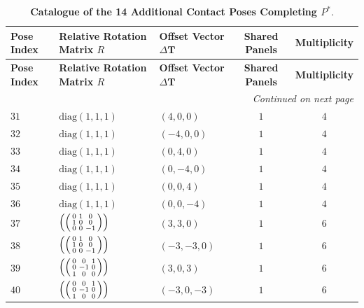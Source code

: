 \documentclass[11pt,a4paper]{article}
\theoremstyle{definition}
\newcommand{\diag}{\mathrm{diag}}
\begin{document}
\begin{longtable}{p{1.2cm}p{3.0cm}p{2.6cm}cc}
\caption{\textbf{Catalogue of the 14 Additional Contact Poses Completing $P^*$}.} \label{tab:app_p_star} \\
\toprule
\textbf{Pose Index} & \textbf{Relative Rotation Matrix $R$} & \textbf{Offset Vector $\Delta\mathbf{T}$} & \textbf{Shared Panels} & \textbf{Multiplicity} \\
\midrule
\endfirsthead
\toprule
\textbf{Pose Index} & \textbf{Relative Rotation Matrix $R$} & \textbf{Offset Vector $\Delta\mathbf{T}$} & \textbf{Shared Panels} & \textbf{Multiplicity} \\
\midrule
\endhead
\midrule
\multicolumn{5}{r}{\small\textit{Continued on next page}} \\
\bottomrule
\endfoot
\bottomrule
\endlastfoot
$31$ & $\diag(1, 1, 1)$ & $(4, 0, 0)$ & $1$ & $4$ \\
$32$ & $\diag(1, 1, 1)$ & $(-4, 0, 0)$ & $1$ & $4$ \\
$33$ & $\diag(1, 1, 1)$ & $(0, 4, 0)$ & $1$ & $4$ \\
$34$ & $\diag(1, 1, 1)$ & $(0, -4, 0)$ & $1$ & $4$ \\
$35$ & $\diag(1, 1, 1)$ & $(0, 0, 4)$ & $1$ & $4$ \\
$36$ & $\diag(1, 1, 1)$ & $(0, 0, -4)$ & $1$ & $4$ \\
$37$ & $\left(\begin{psmallmatrix} 0 & 1 & 0 \\ 1 & 0 & 0 \\ 0 & 0 & -1 \end{psmallmatrix}\right)$ & $(3, 3, 0)$ & $1$ & $6$ \\
$38$ & $\left(\begin{psmallmatrix} 0 & 1 & 0 \\ 1 & 0 & 0 \\ 0 & 0 & -1 \end{psmallmatrix}\right)$ & $(-3, -3, 0)$ & $1$ & $6$ \\
$39$ & $\left(\begin{psmallmatrix} 0 & 0 & 1 \\ 0 & -1 & 0 \\ 1 & 0 & 0 \end{psmallmatrix}\right)$ & $(3, 0, 3)$ & $1$ & $6$ \\
$40$ & $\left(\begin{psmallmatrix} 0 & 0 & 1 \\ 0 & -1 & 0 \\ 1 & 0 & 0 \end{psmallmatrix}\right)$ & $(-3, 0, -3)$ & $1$ & $6$ \\

\end{longtable}
\end{document}
